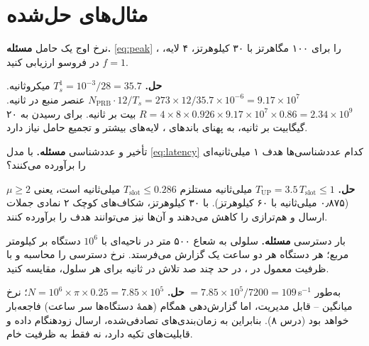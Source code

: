 \documentclass[11pt,a4paper]{article}
\begin{document}
\section{مثال‌های حل‌شده}

\begin{examplebox}{نرخ اوج یک حامل }\label{ex:peak}
\textbf{مسئله.} \cref{eq:peak} را برای ۱۰۰ مگاهرتز با ۳۰ کیلوهرتز، ۴ لایه، ، $f = 1$ در فروسو ارزیابی کنید.

\textbf{حل.} $T_s^{1} = 10^{-3}/28 = 35.7$ میکروثانیه. $N_{\mathrm{PRB}}\cdot12/T_s = 273\times12/35.7\times10^{-6} = 9.17\times10^{7}$
عنصر منبع در ثانیه. $R = 4\times8\times0.926\times9.17\times10^{7}\times0.86 = 2.34\times10^{9}$ بیت بر ثانیه. برای رسیدن به ۲۰ گیگابیت
بر ثانیه،  به پهنای باندهای ، لایه‌های بیشتر و تجمیع حامل نیاز دارد.
\end{examplebox}

\begin{examplebox}{تأخیر و عددشناسی}\label{ex:lat}
\textbf{مسئله.} با مدل \cref{eq:latency} کدام عددشناسی‌ها هدف ۱ میلی‌ثانیه‌ای  را برآورده می‌کنند؟

\textbf{حل.} $T_{\mathrm{UP}} = 3.5\,T_{\mathrm{slot}} \le 1$ میلی‌ثانیه مستلزم $T_{\mathrm{slot}} \le 0.286$ میلی‌ثانیه است، یعنی
$\mu \ge 2$ (۰٫۸۷۵ میلی‌ثانیه با ۶۰ کیلوهرتز). با ۳۰ کیلوهرتز، شکاف‌های کوچک ۲ نمادی جملات ارسال و هم‌ترازی را کاهش می‌دهند
و آن‌ها نیز می‌توانند هدف را برآورده کنند.
\end{examplebox}

\begin{examplebox}{بار دسترسی }\label{ex:density}
\textbf{مسئله.} سلولی به شعاع ۵۰۰ متر در ناحیه‌ای با $10^6$ دستگاه بر کیلومتر مربع؛ هر دستگاه هر دو ساعت یک گزارش می‌فرستد.
نرخ دسترسی را محاسبه و با ظرفیت معمول  در ، در حد چند صد تلاش در ثانیه برای هر سلول، مقایسه کنید.

\textbf{حل.} $N = 10^6\times\pi\times0.25 = 7.85\times10^5$؛ نرخ $= 7.85\times10^5/7200 = 109$\,s$^{-1}$ به‌طور میانگین -- قابل
مدیریت، اما گزارش‌دهی همگام (همهٔ دستگاه‌ها سر ساعت) فاجعه‌بار خواهد بود (درس ۸). بنابراین  به زمان‌بندی‌های
تصادفی‌شده، ارسال زودهنگام داده و قابلیت‌های  تکیه دارد، نه فقط به ظرفیت خام.
\end{examplebox}

\end{document}
